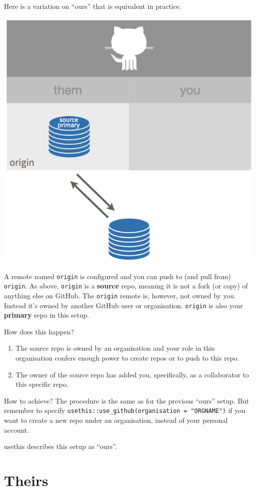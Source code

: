 \documentclass[
]{book}
\providecommand{\tightlist}{%
  \setlength{\itemsep}{0pt}\setlength{\parskip}{0pt}}
\begin{document}
Here is a variation on ``ours'' that is equivalent in practice.

\begin{center}\includegraphics[width=0.6\linewidth]{img/ours-them} \end{center}

A remote named \texttt{origin} is configured and you can push to (and pull from) \texttt{origin}.
As above, \texttt{origin} is a \textbf{source} repo, meaning it is not a fork (or copy) of anything else on GitHub.
The \texttt{origin} remote is, however, not owned by you.
Instead it's owned by another GitHub user or organisation.
\texttt{origin} is also your \textbf{primary} repo in this setup.

How does this happen?

\begin{enumerate}
\def\labelenumi{\arabic{enumi}.}
\tightlist
\item
  The source repo is owned by an organisation and your role in this organisation confers enough power to create repos or to push to this repo.
\item
  The owner of the source repo has added you, specifically, as a collaborator to this specific repo.
\end{enumerate}

How to achieve? The procedure is the same as for the previous ``ours'' setup. But remember to specify \texttt{usethis::use\_github(organisation\ =\ "ORGNAME")} if you want to create a new repo under an organisation, instead of your personal account.

usethis describes this setup as ``ours''.

\section{Theirs}\label{theirs}
\end{document}
